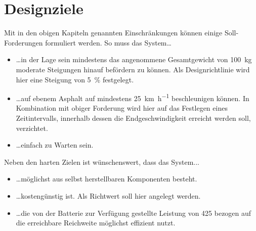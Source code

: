 	\section{Designziele}
		Mit in den obigen Kapiteln genannten Einschränkungen können einige Soll-Forderungen formuliert werden.
		So muss das System\ldots
		\begin{itemize}
			\item \ldots in der Lage sein mindestens das angenommene Gesamtgewicht von \qty{100}{\kilo\gram} moderate Steigungen hinauf befördern zu können.
			Als Designrichtlinie wird hier eine Steigung von \qty{5}{\percent} festgelegt.
			\item \ldots auf ebenem Asphalt auf mindestens \qty{25}{\kilo\metre\per\hour} beschleunigen können.
			In Kombination mit obiger Forderung wird hier auf das Festlegen eines Zeitintervalls, innerhalb dessen die Endgeschwindigkeit erreicht werden soll, verzichtet.
			\item \ldots einfach zu Warten sein.
		\end{itemize}
		Neben den harten Zielen ist wünschenswert, dass das System...
		\begin{itemize}
			\item \ldots möglichst aus selbst herstellbaren Komponenten besteht.
			\item \ldots kostengünstig ist.
			Als Richtwert soll hier  angelegt werden.
			\item \ldots die von der Batterie zur Verfügung gestellte Leistung von \SI{425}{\watthour} bezogen auf die erreichbare Reichweite möglichst effizient nutzt.
		\end{itemize}